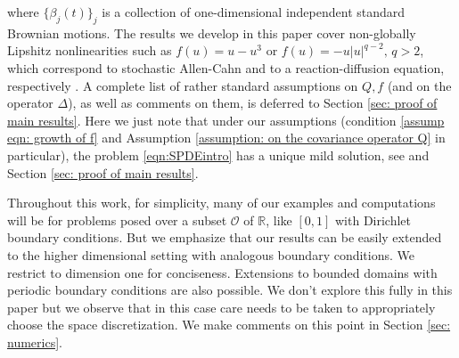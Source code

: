 \documentclass[reqno, 11pt]{amsart}
\theoremstyle{plain}
\theoremstyle{definition}
\theoremstyle{remark}
\numberwithin{equation}{section}
\numberwithin{theorem}{section}
\newcommand{\R}{\mathbb{R}}
\begin{document}
{\begin{equation}
\end{equation}
where $\{\beta_j(t)\}_j$ is a collection of one-dimensional independent standard Brownian motions. 
The results we develop in this paper cover non-globally Lipshitz  nonlinearities such as  $f(u)=u-u^3$ or $f(u) = -u|u|^{q-2}, \, q>2$, which correspond to  stochastic Allen-Cahn and to a reaction-diffusion equation,  respectively \cite{prevot2007concise}. 
A complete list of rather standard assumptions on $Q,f$ (and on the operator $\Delta$),   as well as  comments on them, is deferred to Section \ref{sec: proof of main results}. Here we just note that under our assumptions (condition \eqref{assump eqn: growth of f} and Assumption \ref{assumption: on the covariance operator Q} in particular),  the problem \eqref{eqn:SPDEintro} has a unique mild solution,  see \cite[Proposition 6.2.2]{Cerrai01} and Section \ref{sec: proof of main results}.  

{Throughout this work, for simplicity, many of our examples and computations will be for problems posed over a subset  $\mathcal{O}$ of $\R$, like $[0,1]$ with Dirichlet boundary conditions.   But we emphasize that our results can be easily extended to the higher dimensional setting with analogous boundary conditions.}
 We restrict to dimension one for conciseness.    Extensions to bounded domains with periodic boundary conditions are also possible. We don't explore this fully in this paper but we observe that in this case care needs to be taken to appropriately choose the space discretization. We make comments on this point in Section \ref{sec: numerics}.
 
 


}
\end{document}
